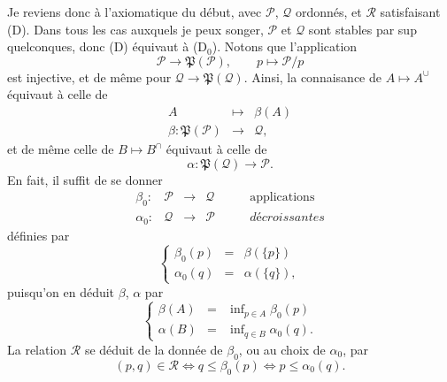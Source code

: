 \documentclass[11pt]{article}
\newcommand{\printedpage}[1]{\marginpar{\footnotesize p.~#1}}
\def\dcprintedpending{}
\newcommand{\msp}[1]{\marginpar{\footnotesize\raggedright
  \ifx\dcprintedpending\empty\else p.~\dcprintedpending\par\fi
  [#1]}\gdef\dcprintedpending{}}
\newcommand{\cP}{\mathcal{P}}
\newcommand{\cQ}{\mathcal{Q}}
\newcommand{\cR}{\mathcal{R}}
\newcommand{\fP}{\mathfrak{P}}
\begin{document}
Je reviens donc à l'axiomatique du début, avec $\cP$, $\cQ$ ordonnés, et $\cR$ satisfaisant (D). Dans tous les cas auxquels je peux songer, $\cP$ et $\cQ$ sont stables par sup quelconques, donc (D) équivaut à (D$_0$). Notons que l'application
\[
\cP \longrightarrow \fP(\cP), \qquad p \longmapsto \cP/p
\]
est injective, et de même pour $\cQ \longrightarrow \fP(\cQ)$. Ainsi, la connaisance de $A \longmapsto A^{\cup}$ équivaut à celle de %
\[
\begin{array}{rcl}
A & \longmapsto & \beta(A)\\[0.5ex]
\beta : \fP(\cP) & \longrightarrow & \cQ,
\end{array}
\]
et de même celle de $B \longmapsto B^{\cap}$ équivaut à
\msp{75}
celle de
\[
\alpha : \fP(\cQ) \longrightarrow \cP.
\]
En fait, il suffit de se donner
\[
\begin{array}{rcccl}
\beta_0 : & \cP & \longrightarrow & \cQ & \qquad \text{applications}\\
\alpha_0 : & \cQ & \longrightarrow & \cP & \qquad \textit{décroissantes}
\end{array}
\tag*{(5.15)}
\]
définies par
\[
\left\{
\begin{array}{rcl}
\beta_0(p) & = & \beta(\{p\})\\[1ex]
\alpha_0(q) & = & \alpha(\{q\}),
\end{array}
\right.
\]
puisqu'on en déduit $\beta$, $\alpha$ par
\[
\left\{
\begin{array}{rcl}
\beta(A) & = & \inf\nolimits_{p \in A} \beta_0(p)\\[1ex]
\alpha(B) & = & \inf\nolimits_{q \in B} \alpha_0(q).
\end{array}
\right.
\tag*{(5.16)}
\]
La relation $\cR$ se déduit de la donnée de $\beta_0$, ou au choix de $\alpha_0$, par
\[
(p,q) \in \cR \iff q \leq \beta_0(p) \iff p \leq \alpha_0(q).
\tag*{(5.17)}
\]

\printedpage{47}
\end{document}
